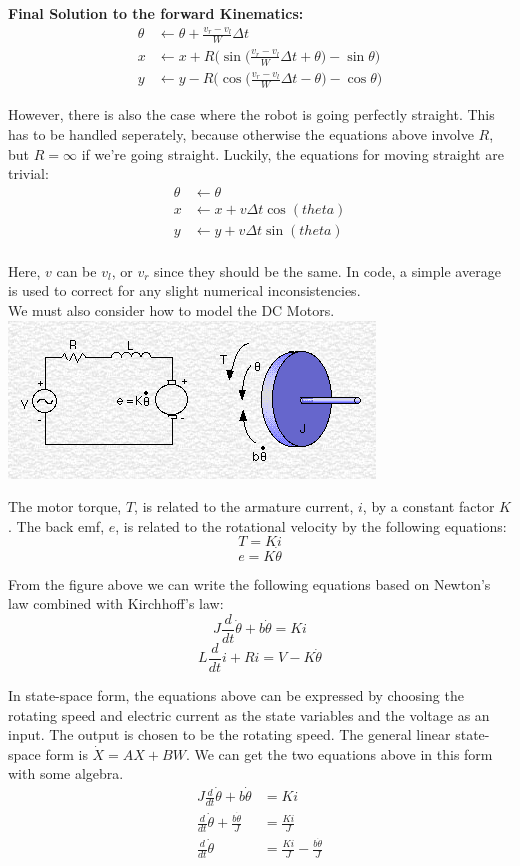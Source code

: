 \documentclass{article}
\begin{document}
\textbf{Final Solution to the forward Kinematics:}
\begin{align}
 \theta &\leftarrow \theta + \frac{v_r-v_l}{W}\Delta t \\
  x &\leftarrow x+R\Bigg(\sin{\Big(\frac{v_r-v_l}{W}\Delta t+\theta\Big)}-\sin{\theta}\Bigg) \\
  y &\leftarrow y-R\Bigg(\cos{\Big(\frac{v_r-v_l}{W}\Delta t-\theta\Big)}-\cos{\theta}\Bigg)
\end{align}

However, there is also the case where the robot is going perfectly straight. This has to be handled seperately, because otherwise the equations above involve $R$, but $R=\infty$ if we're going straight. Luckily, the equations for moving straight are trivial:
\begin{align}
 \theta &\leftarrow \theta \\
  x &\leftarrow x + v\Delta t\cos(theta) \\
  y &\leftarrow y + v\Delta t\sin(theta) \\
\end{align}

Here, $v$ can be $v_l$, or $v_r$ since they should be the same. In code, a simple average is used to correct for any slight numerical inconsistencies. \\

We must also consider how to model the DC Motors. \\

\includegraphics[scale=0.5]{./dc_motor_model.png}

The motor torque, $T$, is related to the armature current, $i$, by a constant factor $K$. The back emf, $e$, is related to the rotational velocity by the following equations:
$$T=Ki$$
$$e=K\dot{\theta}$$

From the figure above we can write the following equations based on Newton's law combined with Kirchhoff's law:
$$J\frac{d}{dt}\dot{\theta} + b\dot{\theta} = Ki$$
$$L\frac{d}{dt}i+Ri=V-K\dot{\theta}$$

In state-space form, the equations above can be expressed by choosing the rotating speed and electric current as the state variables and the voltage as an input. The output is chosen to be the rotating speed. The general linear state-space form is $\dot{X} = AX + BW$. We can get the two equations above in this form with some algebra.
\begin{align}
  J\frac{d}{dt}\dot{\theta} + b\dot{\theta} &= Ki \\
  \frac{d}{dt}\dot{\theta} + \frac{b\dot{\theta}}{J} &= \frac{Ki}{J} \\
  \frac{d}{dt}\dot{\theta} &= \frac{Ki}{J} - \frac{b\dot{\theta}}{J}
\end{align}
\end{document}
